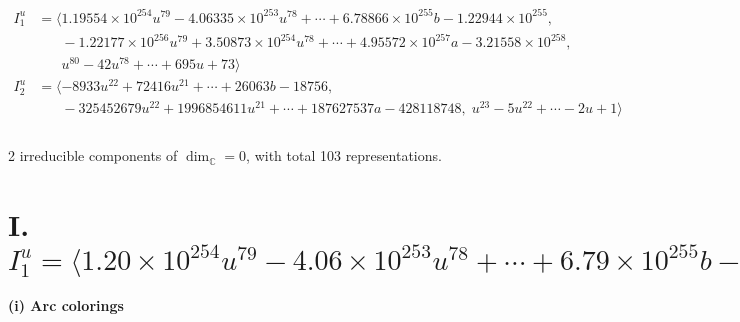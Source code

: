 \documentclass[1p]{elsarticle_modified}
\theoremstyle{definition}
\begin{document}
\begin{align*}
I^u_{1}&=\langle 
1.19554\times10^{254} u^{79}-4.06335\times10^{253} u^{78}+\cdots+6.78866\times10^{255} b-1.22944\times10^{255},\\
\phantom{I^u_{1}}&\phantom{= \langle  }-1.22177\times10^{256} u^{79}+3.50873\times10^{254} u^{78}+\cdots+4.95572\times10^{257} a-3.21558\times10^{258},\\
\phantom{I^u_{1}}&\phantom{= \langle  }u^{80}-42 u^{78}+\cdots+695 u+73\rangle \\
I^u_{2}&=\langle 
-8933 u^{22}+72416 u^{21}+\cdots+26063 b-18756,\\
\phantom{I^u_{2}}&\phantom{= \langle  }-325452679 u^{22}+1996854611 u^{21}+\cdots+187627537 a-428118748,\;u^{23}-5 u^{22}+\cdots-2 u+1\rangle \\
\\
\end{align*}
\raggedright * 2 irreducible components of $\dim_{\mathbb{C}}=0$, with total 103 representations.\\
\newpage
\renewcommand{\arraystretch}{1}
\centering \section*{I. $I^u_{1}= \langle 1.20\times10^{254} u^{79}-4.06\times10^{253} u^{78}+\cdots+6.79\times10^{255} b-1.23\times10^{255},\;-1.22\times10^{256} u^{79}+3.51\times10^{254} u^{78}+\cdots+4.96\times10^{257} a-3.22\times10^{258},\;u^{80}-42 u^{78}+\cdots+695 u+73 \rangle$}
\flushleft \textbf{(i) Arc colorings}\\
\end{document}
